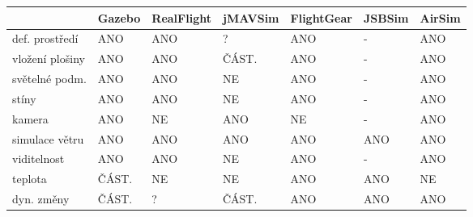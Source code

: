 \begin{tabular}{|l|l|l|l|l|l|l|}
    \hline
     & Gazebo & RealFlight & jMAVSim & FlightGear & JSBSim & AirSim \\ \hline\hline
    def. prostředí & ANO    & ANO        & ?       & ANO        & -      & ANO    \\ \hline
    vložení plošiny    & ANO    & ANO        & ČÁST.   & ANO        & -      & ANO    \\ \hline
    světelné podm.  & ANO    & ANO        & NE      & ANO        & -      & ANO    \\ \hline
    stíny              & ANO    & ANO        & NE      & ANO        & -      & ANO    \\ \hline
    kamera             & ANO    & NE         & ANO     & NE         & -      & ANO    \\ \hline
    simulace větru     & ANO    & ANO        & ANO     & ANO        & ANO    & ANO    \\ \hline
    viditelnost        & ANO    & ANO        & NE      & ANO        & -      & ANO    \\ \hline
    teplota            & ČÁST.  & NE         & NE      & ANO        & ANO    & NE     \\ \hline
    dyn. změny         & ČÁST.  & ?          & ČÁST.   & ANO        & ANO    & ANO    \\ \hline
\end{tabular}